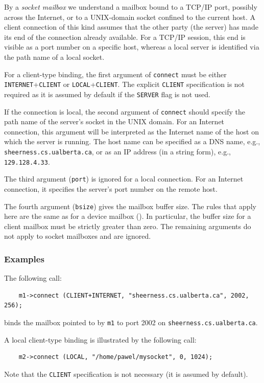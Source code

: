 By a {\em socket mailbox\/} we understand a mailbox bound to a TCP/IP
port, possibly across the Internet, or to a UNIX-domain socket confined
to the current host.
A client connection of this kind assumes that the other party (the
server) has made its end of the connection already available.
For a TCP/IP session, this end is visible as a port number on a specific
host, whereas a local server is identified via the path name of a local
socket.

For a client-type binding, the first argument of {\tt connect}
must be either {\tt INTERNET}+{\tt CLIENT} or {\tt LOCAL}+{\tt CLIENT}.
The explicit {\tt CLIENT} specification is not required as it is assumed
by default if the {\tt SERVER} flag is not used.

If the connection is local, the second argument of {\tt connect} should
specify the path name of the server's socket in the UNIX domain.
For an Internet connection, this argument will be interpreted
as the Internet name of the host on which the server is running.
The host name can be specified as a DNS name, e.g.,
{\tt sheerness.cs.ualberta.ca}, or as an IP address (in a string form),
e.g., {\tt 129.128.4.33}.

The third argument ({\tt port}) is ignored for a local connection.
For an Internet connection, it specifies the server's
port number on the remote host.

The fourth argument ({\tt bsize}) gives the mailbox buffer size.
The rules that apply here are the same as for a device mailbox
().
In particular, the buffer size for a client mailbox must be strictly
greater than zero.
The remaining arguments do not apply to socket mailboxes and are ignored.

\subsubsection*{Examples}

\noindent
The following call:
\begin{verbatim}
    m1->connect (CLIENT+INTERNET, "sheerness.cs.ualberta.ca", 2002, 256);
\end{verbatim}
binds the mailbox pointed to by {\tt m1} to port 2002 on
{\tt sheerness.cs.ualberta.ca}.

A local client-type binding is illustrated by the following call:
\begin{verbatim}
    m2->connect (LOCAL, "/home/pawel/mysocket", 0, 1024);
\end{verbatim}
Note that the {\tt CLIENT} specification is not necessary (it is assumed by
default).

